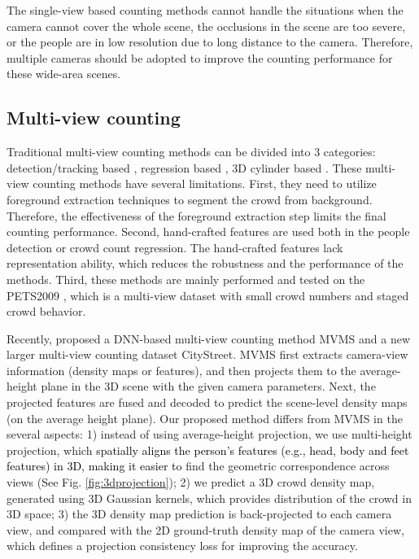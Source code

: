 \documentclass[letterpaper]{article}
\newcommand{\abc}[1]{\textcolor{black}{#1}}
\newcommand{\citep}{\cite}
\newcommand{\citealp}[1]{\citeauthor{#1} \citeyear{#1}}
\begin{document}
The single-view based counting methods cannot handle the situations when the camera cannot cover the whole scene,  the occlusions in the scene are too severe, or the people are in low resolution due to long distance to the camera. Therefore, multiple cameras should be adopted to improve the counting performance for these wide-area scenes.

\subsection{Multi-view counting}

Traditional multi-view counting methods can be divided into 3 categories: detection/tracking based \citep{dittrich2017people,li2012people,ma2012reliable,Maddalena2014people}, regression based \citep{Ryan2014Scene,Tang2014Cross}, 3D cylinder based \citep{Ge2010Crowd}. These multi-view counting methods have several limitations. First, they need to utilize foreground extraction techniques to segment the crowd from background. Therefore, the effectiveness of the foreground extraction step limits the final counting performance. Second, hand-crafted features are used both in the people detection or crowd count regression. The hand-crafted features lack representation ability, which reduces the robustness and the performance of the methods. Third, these methods are mainly performed and tested on the PETS2009 \citep{ferryman2009pets2009}, which is a multi-view dataset with small crowd numbers and staged crowd behavior.

Recently, \citealp{zhang2019wide} proposed a DNN-based multi-view counting method MVMS and a new larger multi-view counting dataset CityStreet. MVMS first extracts camera-view information (density maps or features), and then projects them to the average-height plane in the 3D scene with the given camera parameters. Next, the projected features are fused and decoded to predict the scene-level density maps (on the average height plane). Our proposed method differs from MVMS in the several aspects: 1) instead of using average-height projection, we use multi-height projection, which \abc{spatially aligns the person's features (e.g., head, body and feet features) in 3D, making it easier to} find the geometric correspondence across views (See Fig. \ref{fig:3dprojection}); 2) we predict a 3D crowd density map, generated using 3D Gaussian kernels, which provides distribution of the crowd in 3D space; 3) the 3D density map prediction is back-projected to each camera view, and compared with the 2D ground-truth density map of the camera view, which defines a projection consistency loss for improving the accuracy.
\end{document}
